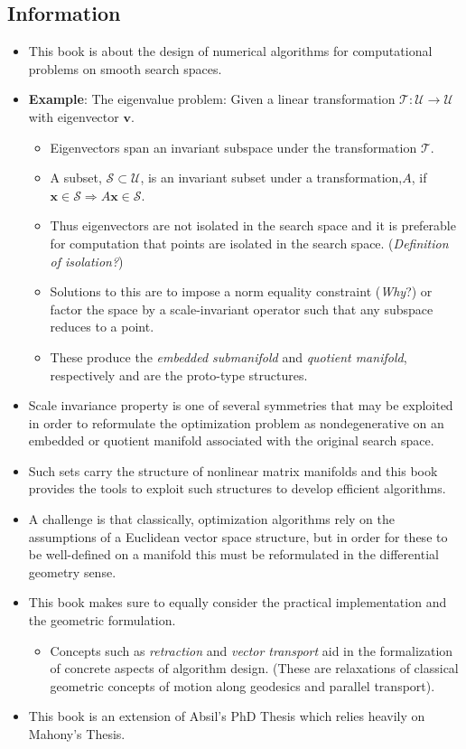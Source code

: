 \documentclass[a4paper]{article}
\begin{document}
\subsection{Information}
\begin{itemize}
\item This book is about the design of numerical algorithms for computational problems on smooth search spaces.
\item \textbf{Example}: The eigenvalue problem: Given a linear transformation $\mathcal{T}:\mathcal{U}\rightarrow\mathcal{U}$ with eigenvector $\mathbf{v}$.

\begin{itemize}
\item Eigenvectors span an invariant subspace under the transformation $\mathcal{T}$.
\item A subset, $\mathcal{S}\subset\mathcal{U}$, is an invariant subset under a transformation,$A$, if $\mathbf{x}\in\mathcal{S}\Rightarrow A\mathbf{x}\in\mathcal{S}$.
\item Thus eigenvectors are not isolated in the search space and it is preferable for computation that points are isolated in the search space. (\textit{Definition of isolation?})
\item Solutions to this are to impose a norm equality constraint (\textit{Why}?) or factor the space by a scale-invariant operator such that any subspace reduces to a point.
\item These produce the \textit{embedded submanifold} and \textit{quotient manifold}, respectively and are the proto-type structures.
\end{itemize}

\item Scale invariance property is one of several symmetries that may be exploited in order to reformulate the optimization problem as nondegenerative on an embedded or quotient manifold associated with the original search space.
\item Such sets carry the structure of nonlinear matrix manifolds and this book provides the tools to exploit such structures to develop efficient algorithms.
\item A challenge is that classically, optimization algorithms rely on the assumptions of a Euclidean vector space structure, but in order for these to be well-defined on a manifold this must be reformulated in the differential geometry sense.
\item This book makes sure to equally consider the practical implementation and the geometric formulation.

\begin{itemize}
\item Concepts such as \textit{retraction} and \textit{vector transport} aid in the formalization of concrete aspects of algorithm design. (These are relaxations of classical geometric concepts of motion along geodesics and parallel transport).
\end{itemize}

\item This book is an extension of Absil's PhD Thesis which relies heavily on Mahony's Thesis.
\end{itemize}
\end{document}
